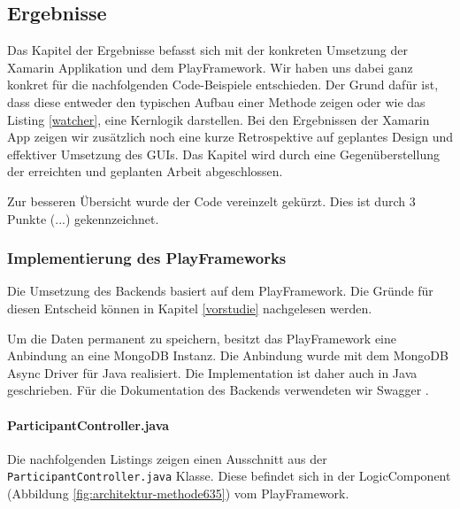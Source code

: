 \subsection{Ergebnisse}
Das Kapitel der Ergebnisse befasst sich mit der konkreten Umsetzung der Xamarin Applikation und dem PlayFramework. Wir haben uns dabei ganz konkret für die nachfolgenden Code-Beispiele entschieden. Der Grund dafür ist, dass diese entweder den typischen Aufbau einer Methode zeigen oder wie das Listing \ref{watcher}, eine Kernlogik darstellen. 
Bei den Ergebnissen der Xamarin App zeigen wir zusätzlich noch eine kurze Retrospektive auf geplantes Design und effektiver Umsetzung des GUIs. Das Kapitel wird durch eine Gegenüberstellung der erreichten und geplanten Arbeit abgeschlossen.

Zur besseren Übersicht wurde der Code vereinzelt gekürzt. Dies ist durch 3 Punkte (...) gekennzeichnet.

\subsubsection{Implementierung des PlayFrameworks}
Die Umsetzung des Backends basiert auf dem PlayFramework. Die Gründe für diesen Entscheid können in Kapitel \ref{vorstudie} nachgelesen werden. 

Um die Daten permanent zu speichern, besitzt das PlayFramework eine Anbindung an eine MongoDB Instanz. Die Anbindung wurde mit dem MongoDB Async Driver für Java \cite{MongoDBAsyncDriver} realisiert. Die Implementation ist daher auch in Java geschrieben. Für die Dokumentation des Backends verwendeten wir Swagger \cite{swagger}.

\paragraph*{ParticipantController.java}
Die nachfolgenden Listings zeigen einen Ausschnitt aus der \texttt{Participant\-Controller\-.java} Klasse. Diese befindet sich in der LogicComponent (Abbildung \ref{fig:architektur-methode635}) vom PlayFramework.

